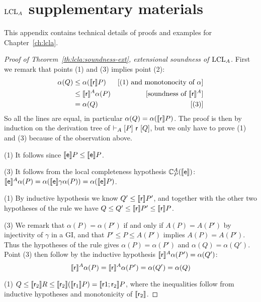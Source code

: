 
\chapter{\texorpdfstring{$\text{LCL}_A$}{LCL} supplementary materials}\label{ch:app:lcla}
This appendix contains technical details of proofs and examples for Chapter~\ref{ch:lcla}.

\begin{proof}[Proof of Theorem~\ref{th:lcla:soundness-ext}, extensional soundness of $\text{LCL}_A$]
	First we remark that points (1) and (3) implies point (2):
	\begin{align*}
		\alpha(Q) &\le \alpha(\llbracket\mathsf{r}\rrbracket P) &[\text{(1) and monotonocity of }\alpha] \\
		&\le \llbracket\mathsf{r}\rrbracket^{A} \alpha(P) &[\text{soundness of }\llbracket\mathsf{r}\rrbracket^{A}] \\
		&= \alpha(Q) &[\text{(3)}]
	\end{align*}
	So all the lines are equal, in particular $\alpha(Q) = \alpha(\llbracket\mathsf{r}\rrbracket P)$.
	The proof is then by induction on the derivation tree of $\vdash_{A}\nobreak[P]~\mathsf{r}~[Q]$, but we only have to prove (1) and (3) because of the observation above.
	
	\noindent (1) It follows since $\llbracket\mathsf{e}\rrbracket P \le \llbracket\mathsf{e}\rrbracket P$.
	
	\noindent (3) It follows from the local completeness hypothesis $\mathbb{C}^{A}_{P}(\llbracket\mathsf{e}\rrbracket)$: $\llbracket\mathsf{e}\rrbracket^{A} \alpha(P) = \alpha(\llbracket\mathsf{e}\rrbracket \gamma \alpha(P)) = \alpha(\llbracket\mathsf{e}\rrbracket P)$.
	
	\noindent (1) By inductive hypothesis we know $Q' \le \llbracket\mathsf{r}\rrbracket P'$, and together with the other two hypotheses of the rule we have $Q \le Q' \le \llbracket\mathsf{r}\rrbracket P' \le \llbracket\mathsf{r}\rrbracket P$.
	
	\noindent (3) We remark that $\alpha(P) = \alpha(P')$ if and only if $A(P) = A(P')$ by injectivity of $\gamma$ in a GI, and that $P' \le P \le A(P')$ implies $A(P) = A(P')$. Thus the hypotheses of the rule gives $\alpha(P) = \alpha(P')$ and $\alpha(Q) = \alpha(Q')$. Point (3) then follow by the inductive hypothesis $\llbracket\mathsf{r}\rrbracket^{A} \alpha(P') = \alpha(Q')$:
	\[
	\llbracket\mathsf{r}\rrbracket^{A} \alpha(P) = \llbracket\mathsf{r}\rrbracket^{A} \alpha(P') = \alpha(Q') = \alpha(Q)
	\]
	
	 (1) $Q \le \llbracket\mathsf{r}_2\rrbracket R \le \llbracket\mathsf{r}_2\rrbracket (\llbracket\mathsf{r}_1\rrbracket P) = \llbracket\mathsf{r}1; \mathsf{r}_2\rrbracket P$, where the inequalities follow from inductive hypotheses and monotonicity of $\llbracket\mathsf{r}_2\rrbracket$.
	

\end{proof}
